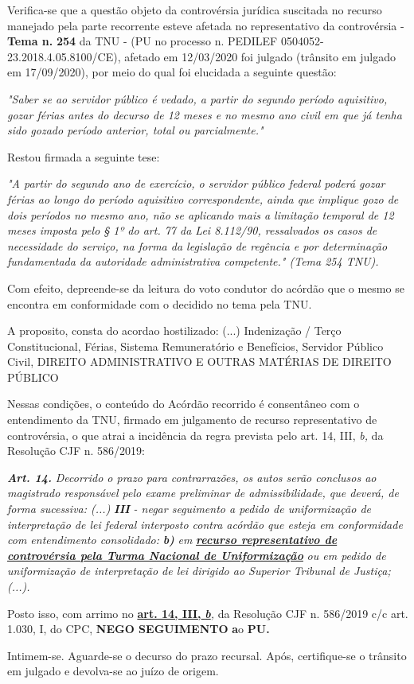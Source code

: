 \documentclass[12pt]{article}
\begin{document}
\justifying
\noindent Verifica-se que a questão objeto da controvérsia jurídica suscitada no recurso manejado pela parte recorrente esteve afetada no representativo da controvérsia - \textbf{Tema n. }\textbf{254} da TNU - (PU no processo n. PEDILEF 0504052-23.2018.4.05.8100/CE),  afetado em 12/03/2020 foi julgado (trânsito em julgado em 17/09/2020), por meio do qual foi elucidada a seguinte questão:

\noindent \textit{"Saber se ao servidor público é vedado, a partir do segundo período aquisitivo, gozar férias antes do decurso de 12 meses e no mesmo ano civil em que já tenha sido gozado período anterior, total ou parcialmente."}

\noindent Restou firmada a seguinte tese:

\noindent \textit{"A partir do segundo ano de exercício, o servidor público federal poderá gozar férias ao longo do período aquisitivo correspondente, ainda que implique gozo de dois períodos no mesmo ano, não se aplicando mais a limitação temporal de 12 meses imposta pelo § 1º do art. 77 da Lei 8.112/90, ressalvados os casos de necessidade do serviço, na forma da legislação de regência e por determinação fundamentada da autoridade administrativa competente." (Tema 254 TNU).}

\noindent Com efeito, depreende-se da leitura do voto condutor do acórdão que o mesmo se encontra em conformidade com o decidido no  tema pela TNU.

\noindent A proposito, consta do acordao hostilizado: (...) Indenização / Terço Constitucional, Férias, Sistema Remuneratório e Benefícios, Servidor Público Civil, DIREITO ADMINISTRATIVO E OUTRAS MATÉRIAS DE DIREITO PÚBLICO

\noindent Nessas condições, o conteúdo do Acórdão recorrido é consentâneo com o entendimento da TNU, firmado em julgamento de recurso representativo de controvérsia, o que atrai a incidência da regra prevista pelo art. 14, III, \textit{b,} da Resolução CJF n. 586/2019:

\noindent \textit{\textbf{Art. 14.}}\textit{ Decorrido o prazo para contrarrazões, os autos serão conclusos ao magistrado responsável pelo exame preliminar de admissibilidade, que deverá, de forma sucessiva: (...) }\textit{\textbf{III }}\textit{- negar seguimento a pedido de uniformização de interpretação de lei federal interposto contra acórdão que esteja em conformidade com entendimento consolidado: }\textit{\textbf{b)}}\textit{ em }\uline{\textit{\textbf{recurso representativo de controvérsia pela Turma Nacional de Uniformização}}}\textit{ ou em pedido de uniformização de interpretação de lei dirigido ao Superior Tribunal de Justiça;(...).}

\noindent Posto isso, com arrimo no \uline{\textbf{art. 14, III, }}\uline{\textit{\textbf{b}}}\textit{,} da Resolução CJF n. 586/2019 c/c art. 1.030, I, do CPC, \textbf{NEGO SEGUIMENTO }\textbf{a}o\textbf{ PU}\textbf{.}

\noindent Intimem-se. Aguarde-se o decurso do prazo recursal. Após, certifique-se o trânsito em julgado e devolva-se ao juízo de origem.
\end{document}

